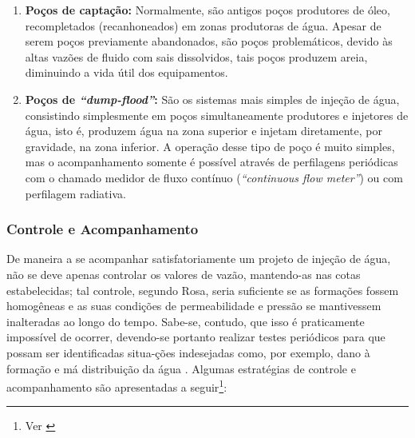 \begin{enumerate}
\item \textbf{Po\c{c}os de capta\c{c}\~{a}o:} Normalmente, s\~{a}o antigos po\c{c}os produtores de \'{o}leo, recompletados (recanhoneados) em zonas produtoras de \'{a}gua. Apesar de serem po\c{c}os previamente abandonados, s\~{a}o po\c{c}os problem\'{a}ticos, devido \`{a}s altas vaz\~{o}es de fluido com sais dissolvidos, tais po\c{c}os produzem areia, diminuindo a vida \'{u}til dos equipamentos.

\item \textbf{Po\c{c}os de \textit{``dump-flood''}:} S\~{a}o os sistemas mais simples de inje\c{c}\~{a}o de \'{a}gua, consistindo simplesmente em po\c{c}os simultaneamente produtores e injetores de \'{a}gua, isto \'{e}, produzem \'{a}gua na zona superior e injetam diretamente, por gravidade, na zona inferior. A opera\c{c}\~{a}o desse tipo de po\c{c}o \'{e} muito simples, mas o acompanhamento somente \'{e} poss\'{i}vel atrav\'{e}s de perfilagens peri\'{o}dicas com o chamado
medidor de fluxo cont\'{i}nuo (\textit{``continuous flow meter''}) ou com perfilagem radiativa.
\end{enumerate}

\subsubsection{Controle e Acompanhamento}
De maneira a se acompanhar satisfatoriamente um projeto de inje\c{c}\~{a}o de \'{a}gua, n\~{a}o se deve apenas controlar os valores de vaz\~{a}o, mantendo-as nas cotas estabelecidas; tal controle, segundo Rosa, seria suficiente se as forma\c{c}\~{o}es fossem homog\^{e}neas e as suas condi\c{c}\~{o}es de permeabilidade e press\~{a}o se mantivessem inalteradas ao longo do tempo. Sabe-se, contudo, que isso \'{e} praticamente imposs\'{i}vel de ocorrer, devendo-se portanto realizar testes peri\'{o}dicos para que possam ser identificadas situa-\c{c}\~{o}es indesejadas como, por exemplo, dano \`{a} forma\c{c}\~{a}o e m\'{a} distribui\c{c}\~{a}o da \'{a}gua \cite[p. 659]{engres}. Algumas estrat\'{e}gias de controle e acompanhamento s\~{a}o apresentadas a seguir\footnote{Ver \cite[pp. 660-662]{engres}}:

